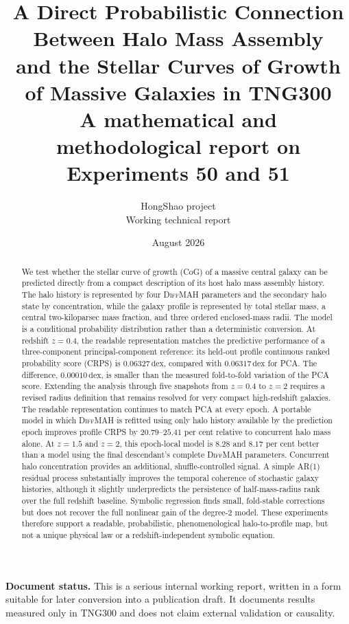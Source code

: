 \documentclass[11pt]{article}
\title{\textbf{A Direct Probabilistic Connection Between Halo Mass Assembly\\
and the Stellar Curves of Growth of Massive Galaxies in TNG300}\\[8pt]
\large A mathematical and methodological report on Experiments 50 and 51}
\author{HongShao project\\\small Working technical report}
\date{August 2026}
\newcommand{\diffmah}{\textnormal{\textsc{DiffMAH}}}
\newcommand{\dex}{\,\mathrm{dex}}
\begin{document}
\maketitle

\begin{abstract}
We test whether the stellar curve of growth (CoG) of a massive central galaxy
can be predicted directly from a compact description of its host halo mass
assembly history. The halo history is represented by four \diffmah{} parameters
and the secondary halo state by concentration, while the galaxy profile is
represented by total stellar mass, a central two-kiloparsec mass fraction, and
three ordered enclosed-mass radii. The model is a conditional probability
distribution rather than a deterministic conversion. At redshift $z=0.4$, the
readable representation matches the predictive performance of a three-component
principal-component reference: its held-out profile continuous ranked
probability score (CRPS) is $0.06327\dex$, compared with $0.06317\dex$ for PCA.
The difference, $0.00010\dex$, is smaller than the measured fold-to-fold
variation of the PCA score. Extending the analysis through five snapshots from
$z=0.4$ to $z=2$ requires a revised radius definition that remains resolved for
very compact high-redshift galaxies. The readable representation continues to
match PCA at every epoch. A portable model in which \diffmah{} is refitted using
only halo history available by the prediction epoch improves profile CRPS by
$20.79$--$25.41$ per cent relative to concurrent halo mass alone. At $z=1.5$
and $z=2$, this epoch-local model is $8.28$ and $8.17$ per cent better than a
model using the final descendant's complete \diffmah{} parameters. Concurrent
halo concentration provides an additional, shuffle-controlled signal. A simple
AR(1) residual process substantially improves the temporal coherence of
stochastic galaxy histories, although it slightly underpredicts the persistence
of half-mass-radius rank over the full redshift baseline. Symbolic regression
finds small, fold-stable corrections but does not recover the full nonlinear
gain of the degree-2 model. These experiments therefore support a readable,
probabilistic, phenomenological halo-to-profile map, but not a unique physical
law or a redshift-independent symbolic equation.
\end{abstract}

\vspace{4pt}
\noindent\textbf{Document status.} This is a serious internal working report,
written in a form suitable for later conversion into a publication draft. It
documents results measured only in TNG300 and does not claim external
validation or causality.

\tableofcontents
\listoffigures
\listoftables
\clearpage












\appendix




\end{document}
